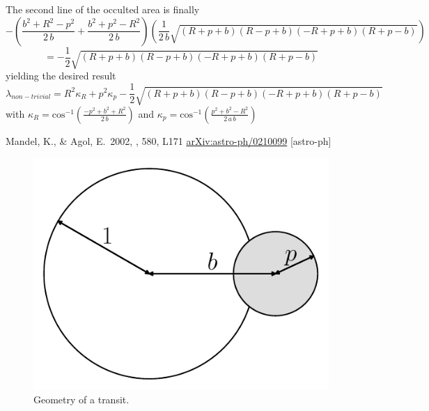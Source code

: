 \documentclass[12pt,preprint]{aastex}
\newcommand{\figlabel}[1]{\label{fig:#1}}
\begin{document}
The second line of the occulted area is finally
\[
- \left( \frac{b^2 +R^2 - p^2}{2 \, b} + \frac{b^2 + p^2 - R^2}{2 \, b} \right)
\left( \frac{1}{2 \, b} \sqrt{(R+p+b)(R-p+b)(-R+p+b)(R+p-b)} \right)
\]
\[
 = - \frac{1}{2} \sqrt{(R+p+b)(R-p+b)(-R+p+b)(R+p-b)}
\]
yielding the desired result
\[
\lambda_{non-trivial} = R^2 \kappa_R + p^2 \kappa_p - \frac{1}{2} \sqrt{(R+p+b)(R-p+b)(-R+p+b)(R+p-b)}
\]
with $\kappa_R = \mathrm{cos}^{-1} \left( \frac{-p^2 + b^2 +R^2}{2 \, b} \right)$ and $\kappa_p = \mathrm{cos}^{-1} \left( \frac{p^2 + b^2 -R^2}{2 \, a \, b} \right)$
\newcommand{\arxiv}[1]{\href{http://arxiv.org/abs/#1}{arXiv:#1}}
\begin{thebibliography}{}\raggedright

        Mandel, K., \& Agol, E.\ 2002, \apjl, 580, L171
        \arxiv{astro-ph/0210099} [astro-ph]

\end{thebibliography}


\clearpage

\begin{figure}[htbp]
    \begin{center}
        \includegraphics[width=\textwidth]{figures/geom.pdf}
    \end{center}
    \caption{Geometry of a transit. \figlabel{geom}}
\end{figure}
\end{document}
